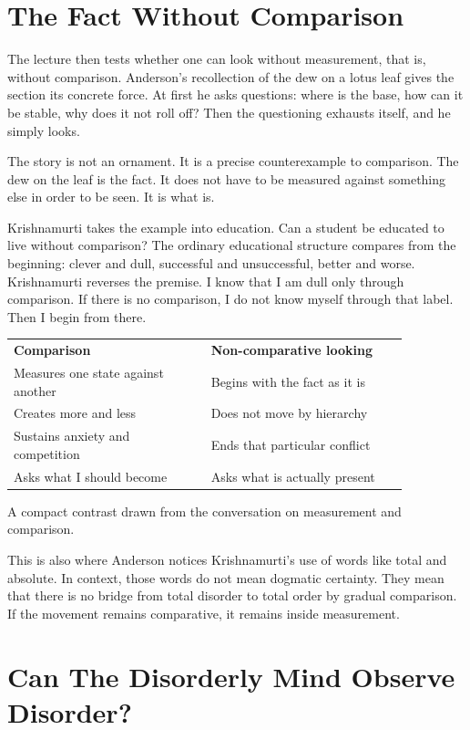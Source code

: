 \section{The Fact Without Comparison}

The lecture then tests whether one can look without measurement, that is, without comparison. Anderson's recollection of the dew on a lotus leaf gives the section its concrete force. At first he asks questions: where is the base, how can it be stable, why does it not roll off? Then the questioning exhausts itself, and he simply looks.

The story is not an ornament. It is a precise counterexample to comparison. The dew on the leaf is the fact. It does not have to be measured against something else in order to be seen. It is what is.

Krishnamurti takes the example into education. Can a student be educated to live without comparison? The ordinary educational structure compares from the beginning: clever and dull, successful and unsuccessful, better and worse. Krishnamurti reverses the premise. I know that I am dull only through comparison. If there is no comparison, I do not know myself through that label. Then I begin from there.

\begin{table}
\centering
\begin{tabular}{p{0.43\linewidth} p{0.43\linewidth}}
\textbf{Comparison} & \textbf{Non-comparative looking}\\
Measures one state against another & Begins with the fact as it is\\
Creates more and less & Does not move by hierarchy\\
Sustains anxiety and competition & Ends that particular conflict\\
Asks what I should become & Asks what is actually present\\
\end{tabular}

A compact contrast drawn from the conversation on measurement and comparison.
\end{table}

This is also where Anderson notices Krishnamurti's use of words like total and absolute. In context, those words do not mean dogmatic certainty. They mean that there is no bridge from total disorder to total order by gradual comparison. If the movement remains comparative, it remains inside measurement.

\section{Can The Disorderly Mind Observe Disorder?}

